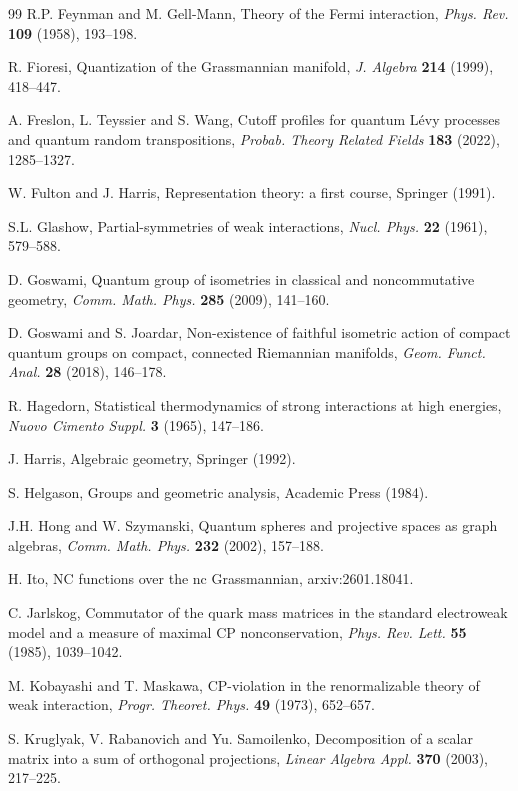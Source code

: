 \documentclass[11pt]{article}
\theoremstyle{plain}
\begin{document}
\begin{thebibliography}{99}
R.P. Feynman and M. Gell-Mann, Theory of the Fermi interaction, {\em Phys. Rev.} {\bf 109} (1958), 193--198.

R. Fioresi, Quantization of the Grassmannian manifold, {\em J. Algebra} {\bf 214} (1999), 418--447.

A. Freslon, L. Teyssier and S. Wang, Cutoff profiles for quantum L\'evy processes and quantum random transpositions, {\em Probab. Theory Related Fields} {\bf 183} (2022), 1285--1327.

W. Fulton and J. Harris, Representation theory: a first course, Springer (1991).

S.L. Glashow, Partial-symmetries of weak interactions, {\em Nucl. Phys.} {\bf 22} (1961), 579--588.

D. Goswami, Quantum group of isometries in classical and noncommutative geometry, {\em Comm. Math. Phys.} {\bf 285} (2009), 141--160.

D. Goswami and S. Joardar, Non-existence of faithful isometric action of compact quantum groups on compact, connected Riemannian manifolds, {\em Geom. Funct. Anal.} {\bf 28} (2018), 146--178.

R. Hagedorn, Statistical thermodynamics of strong interactions at high energies, {\em Nuovo Cimento Suppl.} {\bf 3} (1965), 147--186.

J. Harris, Algebraic geometry, Springer (1992).

S. Helgason, Groups and geometric analysis, Academic Press (1984).

J.H. Hong and W. Szymanski, Quantum spheres and projective spaces as graph algebras, {\em Comm. Math. Phys.} {\bf 232} (2002), 157--188.

H. Ito, NC functions over the nc Grassmannian, {\color{black}arxiv:2601.18041}.

C. Jarlskog, Commutator of the quark mass matrices in the standard electroweak model and a measure of maximal CP nonconservation, {\em Phys. Rev. Lett.} {\bf 55} (1985), 1039--1042.

M. Kobayashi and T. Maskawa, CP-violation in the renormalizable theory of weak interaction, {\em Progr. Theoret. Phys.} {\bf 49} (1973), 652--657.

S. Kruglyak, V. Rabanovich and Yu. Samoilenko, Decomposition of a scalar matrix into a sum of orthogonal projections, {\em Linear Algebra Appl.} {\bf 370} (2003), 217--225.


\end{thebibliography}
\end{document}
